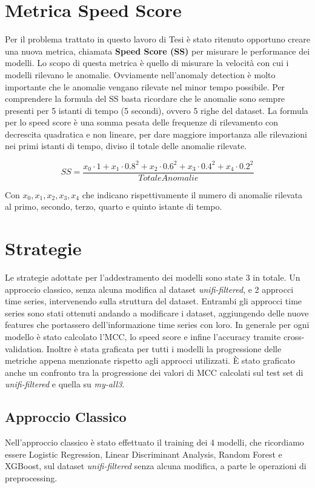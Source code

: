 \section{Metrica Speed Score}
Per il problema trattato in questo lavoro di Tesi \`e stato ritenuto opportuno creare una nuova metrica, chiamata \textbf{Speed Score (SS)} per misurare le performance dei modelli. Lo scopo di questa metrica \`e quello di misurare la velocit\`a con cui i modelli rilevano le anomalie. Ovviamente nell'anomaly detection \`e molto importante che le anomalie vengano rilevate nel minor tempo possibile. Per comprendere la formula del SS basta ricordare che le anomalie sono sempre presenti per 5 istanti di tempo (5 secondi), ovvero 5 righe del dataset. La formula per lo speed score \`e una somma pesata delle frequenze di rilevamento con decrescita quadratica e non lineare, per dare maggiore importanza alle rilevazioni nei primi istanti di tempo, diviso il totale delle anomalie rilevate.
  
    \begin{equation}
      SS = \frac{x_0 \cdot 1 + x_1 \cdot 0.8^2 + x_2 \cdot 0.6^2 + x_3 \cdot 0.4^2 + x_4 \cdot 0.2^2}{TotaleAnomalie}
    \end{equation}

    Con $x_0, x_1, x_2, x_3, x_4$ che indicano rispettivamente il numero di anomalie rilevata al primo, secondo, terzo, quarto e quinto istante di tempo.

\section{Strategie}
Le strategie adottate per l'addestramento dei modelli sono state 3 in totale. Un approccio classico, senza alcuna modifica al dataset \textit{unifi-filtered}, e 2 approcci time series, intervenendo sulla struttura del dataset. Entrambi gli approcci time series sono stati ottenuti andando a modificare i dataset, aggiungendo delle nuove features che portassero dell'informazione time series con loro. In generale per ogni modello \`e stato calcolato l'MCC, lo speed score e infine l'accuracy tramite cross-validation. Inoltre \`e stata graficata per tutti i modelli la progressione delle metriche appena menzionate rispetto agli approcci utilizzati. \`E stato graficato anche un confronto tra la progressione dei valori di MCC calcolati sul test set di \textit{unifi-filtered} e quella su \textit{my-all3}.

\subsection{Approccio Classico}
Nell'approccio classico \`e stato effettuato il training dei 4 modelli, che ricordiamo essere Logistic Regression, Linear Discriminant Analysis, Random Forest e XGBoost, sul dataset \textit{unifi-filtered} senza alcuna modifica, a parte le operazioni di preprocessing.

